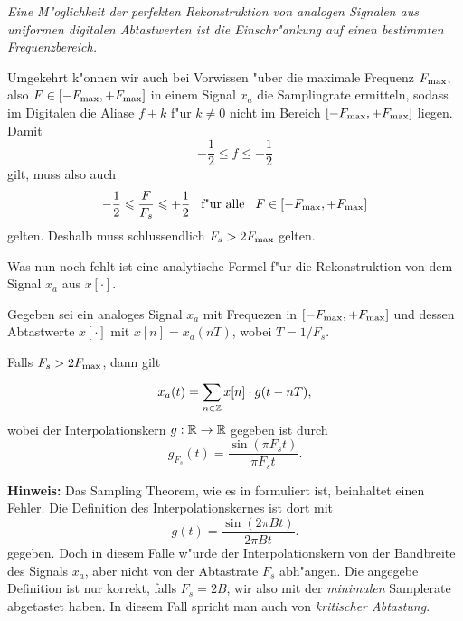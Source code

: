 \emph{Eine M"oglichkeit der perfekten Rekonstruktion von analogen Signalen aus uniformen digitalen Abtastwerten ist die Einschr"ankung auf einen bestimmten Frequenzbereich.}

Umgekehrt k"onnen wir auch bei Vorwissen "uber die maximale Frequenz $F_{\rm max}$, also $F \in [-F_{\rm max},+F_{\rm max}]$ in einem Signal $x_a$ die Samplingrate ermitteln, sodass im Digitalen die Aliase $f + k$ f"ur $k \neq 0$ nicht im Bereich $[-F_{\rm max},+F_{\rm max}]$ liegen.
Damit
\[
    -\frac 12 \leqslant f \leqslant + \frac 12
\]
gilt, muss also auch
\[
    -\frac 12 \leqslant \frac{F}{F_s} \leqslant + \frac 12 {\hspace{3mm} \text{f"ur alle} \hspace{3mm}} F \in [-F_{\rm max},+F_{\rm max}]
\]
gelten.
Deshalb muss schlussendlich $F_s > 2 F_{\rm max}$ gelten.

Was nun noch fehlt ist eine analytische Formel f"ur die Rekonstruktion von dem Signal $x_a$ aus $x[\cdot]$.
\begin{Thm}\label{stm:sampling_theorem}
Gegeben sei ein analoges Signal $x_a$ mit Frequezen in $[-F_{\rm max},+F_{\rm max}]$ und dessen Abtastwerte $x[\cdot]$ mit $x[n] = x_a(nT)$, wobei $T = 1/F_s$.

Falls $F_s > 2 F_{\rm max}$, dann gilt
\begin{equation}\label{eq:sampling_theorem}
    x_a(t) = {\sum\limits_{n \in \mathbb{Z}}^{}{
        x[n] \cdot g(t - n T),
    }}
\end{equation}
wobei der Interpolationskern $g : \mathbb{R} \rightarrow \mathbb{R}$ gegeben ist durch
\[
g_{F_s}(t) = \frac{\sin(\pi F_s t)}{\pi F_s t}.
\]
\end{Thm}

\textbf{Hinweis:} Das Sampling Theorem, wie es in \cite{proakis2013} formuliert ist, beinhaltet einen Fehler. Die Definition des Interpolationskernes ist dort mit
\[
g(t) = \frac{\sin(2 \pi B t)}{2 \pi B t}.
\]
gegeben. Doch in diesem Falle w"urde der Interpolationskern von der Bandbreite des Signals $x_a$, aber nicht von der Abtastrate $F_s$ abh"angen. 
Die angegebe Definition ist nur korrekt, falls $F_s = 2 B$, wir also mit der \emph{minimalen} Samplerate abgetastet haben.
In diesem Fall spricht man auch von \emph{kritischer Abtastung}.

